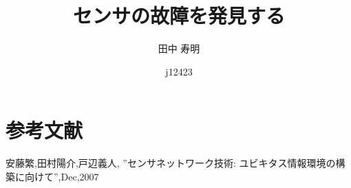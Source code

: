 \documentclass[twocolumn]{jsarticle}
\begin{document}
\pagestyle{empty}

\date{j12423}
\title{センサの故障を発見する}
\author{田中 寿明}

\section{参考文献}

\begin{thebibliography}{9}
\bibitem{} 安藤繁,田村陽介,戸辺義人,
''センサネットワーク技術: ユビキタス情報環境の構築に向けて'',Dec,2007

\end{thebibliography}
\end{document}
